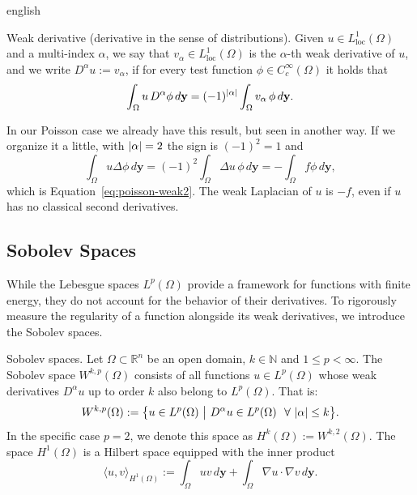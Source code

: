 \documentclass[0000.tex]{subfiles}
\begin{document}
\begin{hyphenrules}{english}
\begin{definicion}{Weak derivative (derivative in the sense of distributions).}\label{def:weak-derivative}
Given $u\in L^1_{\mathrm{loc}}(\Omega)$ and a multi-index $\alpha$, we say that
$v_\alpha\in L^1_{\mathrm{loc}}(\Omega)$ is the $\alpha$-th weak derivative of $u$, and we write
$D^\alpha u:=v_\alpha$, if for every test function $\phi\in C_c^\infty(\Omega)$ it holds that
\cite{reyna_sobolev}
\begin{equation}
  \int_\Omega u\,D^\alpha\phi\,d\mathbf{y}=(-1)^{\left\lvert \alpha \right\rvert}\int_\Omega v_\alpha\,\phi\,d\mathbf{y}.
  \label{eq:weak-derivative}
\end{equation}
\end{definicion}

In our Poisson case we already have this result, but seen in another way. If we organize it a little,
with $\left\lvert \alpha \right\rvert=2$ the sign is $(-1)^2=1$ and
\begin{equation}
  \int_\Omega u\Delta\phi\,d\mathbf{y}=(-1)^2\int_\Omega\Delta u\,\phi\,d\mathbf{y}=-\int_\Omega f\phi\,d\mathbf{y},
  \label{eq:weak-poisson-again}
\end{equation}
which is Equation~\eqref{eq:poisson-weak2}. The weak Laplacian of $u$ is $-f$, even if $u$ has no classical second
derivatives.

\subsection{Sobolev Spaces}\label{subsec:sobolev}

While the Lebesgue spaces $L^p(\Omega)$ provide a framework for functions with finite energy, they do
not account for the behavior of their derivatives. To rigorously measure the regularity of a function
alongside its weak derivatives, we introduce the Sobolev spaces.

\begin{definicion}{Sobolev spaces.}\label{def:sobolev}
Let $\Omega\subset\mathbb{R}^n$ be an open domain, $k\in\mathbb{N}$ and $1\le p<\infty$. The Sobolev space
$W^{k,p}(\Omega)$ consists of all functions $u\in L^p(\Omega)$ whose weak derivatives $D^\alpha u$ up to
order $k$ also belong to $L^p(\Omega)$. That is:
\begin{equation}
  W^{k,p}(\Omega):=\big\{u\in L^p(\Omega)\ \big|\ D^\alpha u\in L^p(\Omega)\ \ \forall\,\abs{\alpha}\le k\big\}.
  \label{eq:sobolev}
\end{equation}
In the specific case $p=2$, we denote this space as $H^k(\Omega):=W^{k,2}(\Omega)$. The space
$H^1(\Omega)$ is a Hilbert space equipped with the inner product
\begin{equation}
  \langle u,v\rangle_{H^1(\Omega)}:=\int_\Omega uv\,d\mathbf{y}+\int_\Omega\nabla u\cdot\nabla v\,d\mathbf{y}.
  \label{eq:h1-inner}
\end{equation}
\end{definicion}


\end{hyphenrules}
\end{document}
